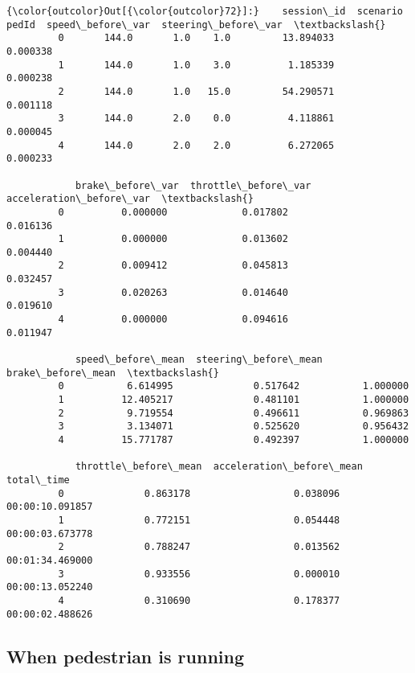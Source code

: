 \documentclass[11pt]{article}
\begin{document}
\begin{Verbatim}[commandchars=\\\{\}]
{\color{outcolor}Out[{\color{outcolor}72}]:}    session\_id  scenario  pedId  speed\_before\_var  steering\_before\_var  \textbackslash{}
         0       144.0       1.0    1.0         13.894033             0.000338   
         1       144.0       1.0    3.0          1.185339             0.000238   
         2       144.0       1.0   15.0         54.290571             0.001118   
         3       144.0       2.0    0.0          4.118861             0.000045   
         4       144.0       2.0    2.0          6.272065             0.000233   
         
            brake\_before\_var  throttle\_before\_var  acceleration\_before\_var  \textbackslash{}
         0          0.000000             0.017802                 0.016136   
         1          0.000000             0.013602                 0.004440   
         2          0.009412             0.045813                 0.032457   
         3          0.020263             0.014640                 0.019610   
         4          0.000000             0.094616                 0.011947   
         
            speed\_before\_mean  steering\_before\_mean  brake\_before\_mean  \textbackslash{}
         0           6.614995              0.517642           1.000000   
         1          12.405217              0.481101           1.000000   
         2           9.719554              0.496611           0.969863   
         3           3.134071              0.525620           0.956432   
         4          15.771787              0.492397           1.000000   
         
            throttle\_before\_mean  acceleration\_before\_mean      total\_time  
         0              0.863178                  0.038096 00:00:10.091857  
         1              0.772151                  0.054448 00:00:03.673778  
         2              0.788247                  0.013562 00:01:34.469000  
         3              0.933556                  0.000010 00:00:13.052240  
         4              0.310690                  0.178377 00:00:02.488626  
\end{Verbatim}
            
    \subsection{When pedestrian is
running}\label{when-pedestrian-is-running}
\end{document}
